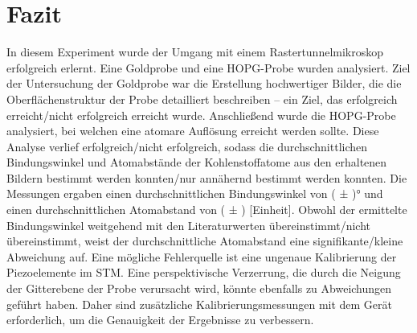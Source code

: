 \chapter{Fazit}
In diesem Experiment wurde der Umgang mit einem Rastertunnelmikroskop erfolgreich erlernt. Eine Goldprobe und eine HOPG-Probe wurden analysiert. Ziel der Untersuchung der Goldprobe war die Erstellung hochwertiger Bilder, die die Oberflächenstruktur der Probe detailliert beschreiben – ein Ziel, das erfolgreich erreicht/nicht erfolgreich erreicht wurde. Anschließend wurde die HOPG-Probe analysiert, bei welchen eine atomare Auflösung erreicht werden sollte. Diese Analyse verlief erfolgreich/nicht erfolgreich, sodass die durchschnittlichen Bindungswinkel und Atomabstände der Kohlenstoffatome aus den erhaltenen Bildern bestimmt werden konnten/nur annähernd bestimmt werden konnten.
Die Messungen ergaben einen durchschnittlichen Bindungswinkel von ( ± )° und einen durchschnittlichen Atomabstand von ( ± ) [Einheit]. Obwohl der ermittelte Bindungswinkel weitgehend mit den Literaturwerten übereinstimmt/nicht übereinstimmt, weist der durchschnittliche Atomabstand eine signifikante/kleine Abweichung auf. Eine mögliche Fehlerquelle ist eine ungenaue Kalibrierung der Piezoelemente im STM. Eine perspektivische Verzerrung, die durch die Neigung der Gitterebene der Probe verursacht wird, könnte ebenfalls zu Abweichungen geführt haben. Daher sind zusätzliche Kalibrierungsmessungen mit dem Gerät erforderlich, um die Genauigkeit der Ergebnisse zu verbessern.